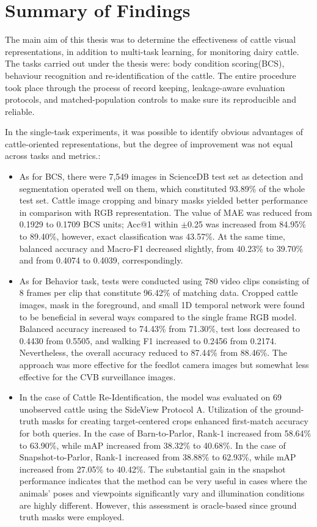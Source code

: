 \section{Summary of Findings}

The main aim of this thesis was to determine the effectiveness of cattle visual representations, in addition to multi-task learning, for monitoring dairy cattle. The tasks carried out under the thesis were: body condition scoring(BCS), behaviour recognition and re-identification of the cattle. The entire procedure took place through the process of record keeping, leakage-aware evaluation protocols, and matched-population controls to make sure its reproducible and reliable.

In the single-task experiments, it was possible to identify obvious advantages of cattle-oriented representations, but the degree of improvement was not equal across tasks and metrics.:
\begin{itemize}
    \item As for BCS, there were 7,549 images in ScienceDB test set as detection and segmentation operated well on them, which constituted 93.89\% of the whole test set. Cattle image cropping and binary masks yielded better performance in comparison with RGB representation. The value of MAE was reduced from 0.1929 to 0.1709 BCS units; Acc@1 within $\pm$0.25 was increased from 84.95\% to 89.40\%, however, exact classification was 43.57\%. At the same time, balanced accuracy and Macro-F1 decreased slightly, from 40.23\% to 39.70\% and from 0.4074 to 0.4039, correspondingly.
    \item As for Behavior task, tests were conducted using 780 video clips consisting of 8 frames per clip that constitute 96.42\% of matching data. Cropped cattle images, mask in the foreground, and small 1D temporal network were found to be beneficial in several ways compared to the single frame RGB model. Balanced accuracy increased to 74.43\% from 71.30\%, test loss decreased to 0.4430 from 0.5505, and walking F1 increased to 0.2456 from 0.2174. Nevertheless, the overall accuracy reduced to 87.44\% from 88.46\%. The approach was more effective for the feedlot camera images but somewhat less effective for the CVB surveillance images.
    \item In the case of Cattle Re-Identification, the model was evaluated on 69 unobserved cattle using the SideView Protocol A. Utilization of the ground-truth masks for creating target-centered crops enhanced first-match accuracy for both queries. In the case of Barn-to-Parlor, Rank-1 increased from 58.64\% to 63.90\%, while mAP increased from 38.32\% to 40.68\%. In the case of Snapshot-to-Parlor, Rank-1 increased from 38.88\% to 62.93\%, while mAP increased from 27.05\% to 40.42\%. The substantial gain in the snapshot performance indicates that the method can be very useful in cases where the animals' poses and viewpoints significantly vary and illumination conditions are highly different. However, this assessment is oracle-based since ground truth masks were employed.
\end{itemize}

